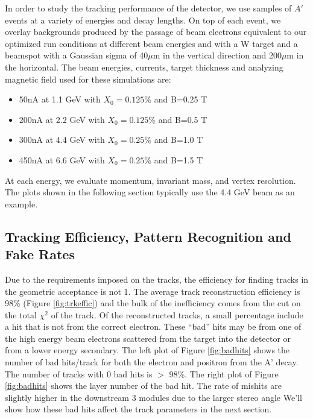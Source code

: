 \label{sec:trkperf}


In order to study the tracking performance of the detector, we use samples of $A'$ events 
at a variety of energies and decay lengths.  On top of each event, we overlay backgrounds 
produced by the passage of  beam electrons equivalent to our optimized run conditions at
different beam energies and with a W target and a beamspot with a Gaussian sigma of 40$\mu$m in the vertical direction and 
200$\mu$m in the horizontal. The beam energies, currents, target thickness and analyzing magnetic field  used for these simulations are:
\begin{itemize}
\item 50nA at 1.1 GeV with $X_0=0.125$\% and  B=0.25 T
\item 200nA at 2.2 GeV with $X_0=0.125$\% and  B=0.5 T
\item 300nA at 4.4 GeV with $X_0=0.25$\% and  B=1.0 T
\item 450nA at 6.6 GeV with $X_0=0.25$\% and  B=1.5 T
\end{itemize}
At each energy, we evaluate momentum, invariant mass, and vertex resolution.  The plots shown in the following section typically use the 4.4 GeV beam as an example.  

\subsection{Tracking Efficiency, Pattern Recognition and Fake Rates}

Due to the requirements imposed on the tracks, the efficiency for finding tracks in the 
geometric acceptance is not 1. The average track reconstruction efficiency is 98\% (Figure \ref{fig:trkeffic}) and 
the bulk of the inefficiency comes from the cut on the total $\chi^2$ of the track. 
Of the reconstructed tracks, a small percentage include a hit that is not from 
the correct electron.  These ``bad'' hits may be from one of the high energy beam 
electrons scattered from the target into the detector or from a lower energy secondary.  
The left plot of Figure \ref{fig:badhits} shows the number of bad hits/track for both the electron 
and positron from the A' decay.  The number of tracks with 0 bad hits is $>$ 98\%.
The right plot of Figure \ref{fig:badhits} shows the layer number of the bad hit.  
The rate of mishits are slightly higher in the downstream 3 modules due to the larger stereo angle %
We'll show how these bad hits affect the track parameters in the next section.


